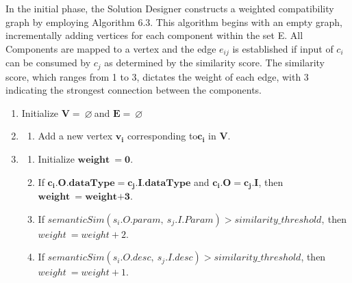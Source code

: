 In the initial phase, the Solution Designer constructs a weighted
compatibility graph by employing Algorithm 6.3.
This algorithm begins with an empty graph, incrementally adding vertices
for each component within the set E. All Components are mapped to a
vertex and the edge \(e_{ij}\) is established if input of \(c_{i}\) can
be consumed by \(c_{j}\) as determined by the similarity score. The
similarity score, which ranges from 1 to 3, dictates the weight of each
edge, with 3 indicating the strongest connection between the components.

\setlength{\algomargin}{2em} %
\begin{algorithm}
	\DontPrintSemicolon
	
	\begin{enumerate}
	\item 
	Initialize \(\mathbf{V = \ }\mathbf{\varnothing\ }\)and
	  \(\mathbf{E = \ \varnothing}\)
	\item 
			{
			\begin{enumerate}
							  \def\labelenumii{\alph{enumii}.}
							  \item
							  Add a new vertex \(\mathbf{v}_{\mathbf{i}}\) corresponding
							    to\(\mathbf{c}_{\mathbf{i}}\) in \(\mathbf{V}\).
							  \end{enumerate}
			}\label{endfor}
	\item 
				{
				\begin{enumerate}
								  \def\labelenumii{\alph{enumii}.}
								  \item
								    Initialize \(\mathbf{weight}\mathbf{\ }\mathbf{=}\mathbf{0}\).
								  \item
								 		If
								   \(\mathbf{c}_{\mathbf{i}}\mathbf{.}\mathbf{O}\mathbf{.}\mathbf{dataType}\mathbf{=}\mathbf{c}_{\mathbf{j}}\mathbf{.}\mathbf{I}\mathbf{.}\mathbf{dataType}\)
								   and
								   \(\mathbf{c}_{\mathbf{i}}\mathbf{.}\mathbf{O}\mathbf{=}\mathbf{c}_{\mathbf{j}}\mathbf{.}\mathbf{I}\),
								   then
								   \(\mathbf{weight}\mathbf{\ }\mathbf{=}\mathbf{weight}\mathbf{+ 3}\).
								   
								   \item 
								   If
								     \(semanticSim\left( s_{i}.O.param,\ s_{j}.I.Param \right) > similarity\_ threshold,\ \)then
								     \(weight\  = weight + 2\).
								     \item 
								     If
								       \(semanticSim\left( s_{i}.O.desc,\ s_{j}.I.desc \right) > similarity\_ threshold\),
								       then \(weight\  = weight + 1\).
								  \end{enumerate}
				}\label{endfor}
	

\end{enumerate}
\end{algorithm}
